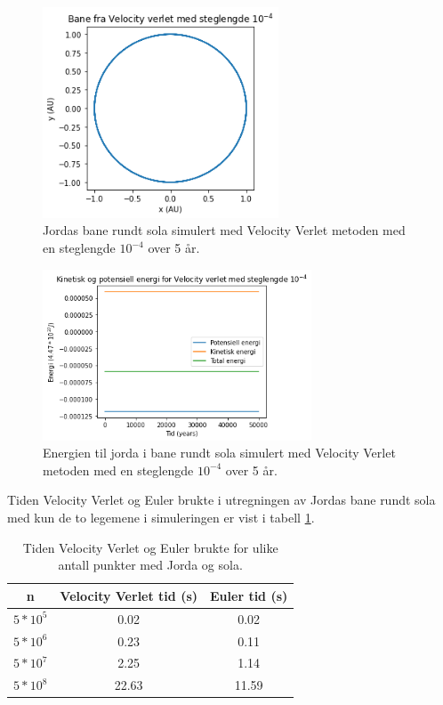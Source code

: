 \documentclass[reprint,english,notitlepage]{revtex4-1}
\begin{document}
	\begin{figure}[H]
		\includegraphics[width=70mm]{../../Code/Figures/vverlet4.png}
		\caption{Jordas bane rundt sola simulert med Velocity Verlet metoden med en steglengde $10^{-4}$ over 5 år.}
		\label{fig:vverlet4}
	\end{figure}
	
	\begin{figure}[H]
		\includegraphics[width=80mm]{../../Code/Figures/vverleten4.png}
		\caption{Energien til jorda i bane rundt sola simulert med Velocity Verlet metoden med en steglengde $10^{-4}$ over 5 år.}
		\label{fig:vverleten4}
	\end{figure}
	Tiden Velocity Verlet og Euler brukte i utregningen av Jordas bane rundt sola med kun de to legemene i simuleringen er vist i tabell \ref{tab:time}.

	\begin{table}[H]
		\begin{center}
			\caption{Tiden Velocity Verlet og Euler brukte for ulike antall punkter med Jorda og sola.}
			\label{tab:time}
			\begin{tabular}{|c|c|c|} \hline
				\textbf{n} & \textbf{Velocity Verlet tid (s)} & \textbf{Euler tid (s)} \\ \hline
				$5*10^5$ & 0.02 & 0.02 \\
				$5*10^6$ & 0.23 & 0.11 \\
				$5*10^7$ & 2.25 & 1.14 \\
				$5*10^8$ & 22.63 & 11.59 \\ \hline
			\end{tabular}
		\end{center}
	\end{table}
\end{document}
